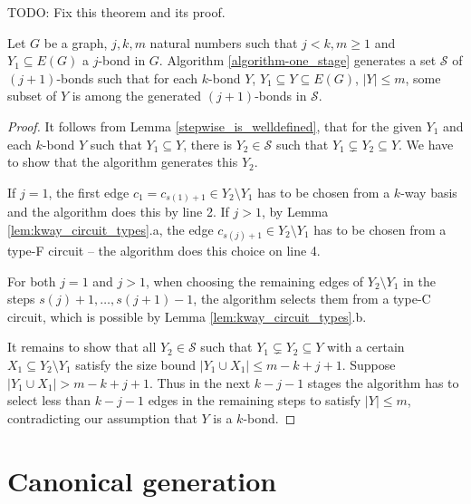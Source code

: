 \clearpage

TODO: Fix this theorem and its proof.

\begin{thm}
	Let $G$ be a graph, $j,k,m$ natural numbers such that $j < k, m \geq 1$ and $Y_1 \subseteq E(G)$ a $j$-bond in $G$. Algorithm \ref{algorithm-one_stage} generates a set $\mathcal{S}$ of $(j+1)$-bonds such that for each $k$-bond $Y$, $Y_1 \subseteq Y \subseteq E(G)$, $\lvert Y \rvert \leq m$, some subset of $Y$ is among the generated $(j+1)$-bonds in $\mathcal{S}$.
\end{thm}

\begin{proof}
	It follows from Lemma \ref{stepwise_is_welldefined}, that for the given $Y_1$ and each $k$-bond $Y$ such that $Y_1 \subseteq Y$, there is $Y_2 \in \mathcal{S}$ such that $Y_1 \subsetneq Y_2 \subseteq Y$. We have to show that the algorithm generates this $Y_2$.

	If $j = 1$, the first edge $c_1 = c_{s(1)+1} \in Y_2 \setminus Y_1$ has to be chosen from a $k$-way basis and the algorithm does this by line 2. If $j > 1$, by Lemma \ref{lem:kway_circuit_types}.a, the edge $c_{s(j)+1} \in Y_2 \setminus Y_1$ has to be chosen from a \break type-F circuit -- the algorithm does this choice on line 4.

 For both $j = 1$ and $j > 1$, when choosing the remaining edges of $Y_2 \setminus Y_1$ in the steps $s(j) + 1, \ldots, s(j+1)-1$, the algorithm selects them from a type-C circuit, which is possible by Lemma \ref{lem:kway_circuit_types}.b.


 It remains to show that all $Y_2 \in \mathcal{S}$ such that $Y_1 \subsetneq Y_2 \subseteq Y$ with a certain $X_1 \subseteq Y_2 \setminus Y_1$ satisfy the size bound $\lvert Y_1 \cup X_1 \rvert \leq m - k + j + 1$. Suppose $\lvert Y_1 \cup X_1 \rvert > m - k + j + 1$. Thus in the next $k - j - 1$ stages the algorithm has to select less than $k - j - 1$ edges in the remaining steps to satisfy $\lvert Y \rvert \leq m$, contradicting our assumption that $Y$ is a $k$-bond.
\end{proof}


\chapter{Canonical generation}
\label{ch:canonical}

